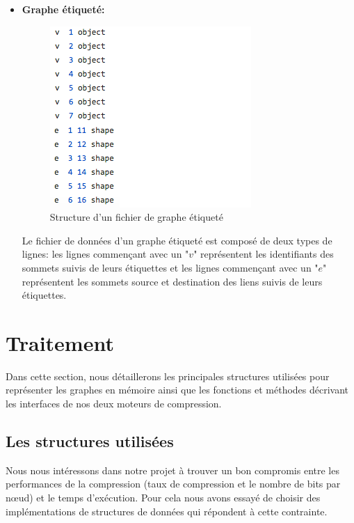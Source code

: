 \begin{itemize}[label=$\bullet$]
	\item \textbf{Graphe étiqueté:} 
	\begin{figure}[H]
	
	
	\includegraphics[scale=0.6]{ressources/image/etiquegr.png}
	\caption{Structure d'un fichier de graphe étiqueté}
	\label{Img:etiqGr}
 \end{figure}

Le fichier de données d'un graphe étiqueté est composé de deux types de lignes: les lignes commençant avec un "$v$" représentent les identifiants des sommets suivis de leurs étiquettes et les lignes commençant avec un "$e$" représentent les sommets source et destination des liens suivis de leurs étiquettes.
	
	\end{itemize}
	
	
	
	\section{Traitement}

Dans cette section, nous détaillerons les principales structures utilisées pour représenter les graphes en mémoire ainsi que les fonctions et méthodes décrivant les interfaces de nos deux moteurs  de compression. 
\subsection{Les structures utilisées }
Nous nous intéressons dans notre projet à trouver un bon compromis entre les performances de la compression (taux de compression et le nombre de bits par nœud) et le temps d'exécution. Pour cela nous avons essayé de choisir des implémentations de structures de données qui répondent à cette contrainte.

